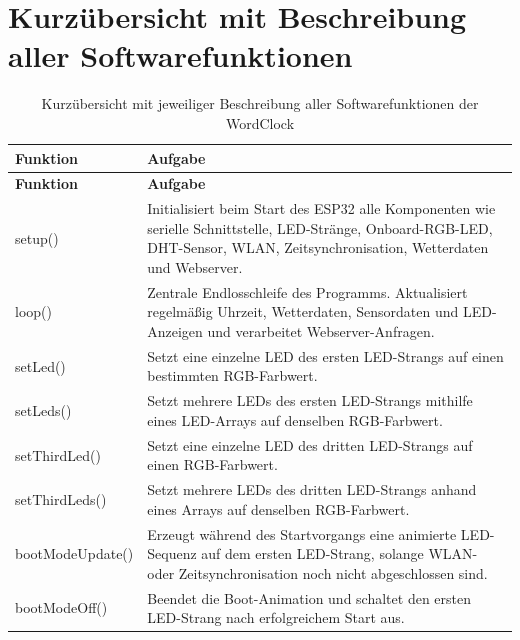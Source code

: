 \section{Kurzübersicht mit Beschreibung aller Softwarefunktionen}
\label{apx:0}
\begin{longtable}{p{} p{}}
\caption[Kurzübersicht mit Beschreibung aller Softwarefunktionen]{Kurzübersicht mit jeweiliger Beschreibung aller Softwarefunktionen der WordClock}
\label{tab:funktionen_wordclock} \\

\hline
\textbf{Funktion} & \textbf{Aufgabe} \\
\hline
\endfirsthead

\hline
\textbf{Funktion} & \textbf{Aufgabe} \\
\hline
\endhead

\hline
\endfoot

{\small\ttfamily setup()} &
Initialisiert beim Start des ESP32 alle Komponenten wie serielle Schnittstelle, LED-Stränge, Onboard-RGB-LED, DHT-Sensor, WLAN, Zeitsynchronisation, Wetterdaten und Webserver. \\

{\small\ttfamily loop()} &
Zentrale Endlosschleife des Programms. Aktualisiert regelmäßig Uhrzeit, Wetterdaten, Sensordaten und LED-Anzeigen und verarbeitet Webserver-Anfragen. \\

{\small\ttfamily setLed()} &
Setzt eine einzelne LED des ersten LED-Strangs auf einen bestimmten RGB-Farbwert. \\

{\small\ttfamily setLeds()} &
Setzt mehrere LEDs des ersten LED-Strangs mithilfe eines LED-Arrays auf denselben RGB-Farbwert. \\

{\small\ttfamily setThirdLed()} &
Setzt eine einzelne LED des dritten LED-Strangs auf einen RGB-Farbwert. \\

{\small\ttfamily setThirdLeds()} &
Setzt mehrere LEDs des dritten LED-Strangs anhand eines Arrays auf denselben RGB-Farbwert. \\

{\small\ttfamily bootModeUpdate()} &
Erzeugt während des Startvorgangs eine animierte LED-Sequenz auf dem ersten LED-Strang, solange WLAN- oder Zeitsynchronisation noch nicht abgeschlossen sind. \\

{\small\ttfamily bootModeOff()} &
Beendet die Boot-Animation und schaltet den ersten LED-Strang nach erfolgreichem Start aus. \\


\end{longtable}
